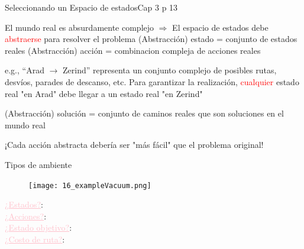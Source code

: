 \documentclass{beamer}
\theoremstyle{definition}
\theoremstyle{theorem}
\theoremstyle{remark}
\begin{document}
\begin{frame}{Seleccionando un Espacio de estados}{Cap 3 p 13}
        
    El mundo real es absurdamente complejo \newline
    \hspace*{1em} $\Rightarrow$ El espacio de estados debe \textcolor{red}{abstraerse} para resolver el problema \newline
    (Abstracción) estado = conjunto de estados reales\newline
    (Abstracción) acción = combinacion compleja de acciones reales\newline
       
    \hspace*{1em} e.g., “Arad $\rightarrow$ Zerind” representa un conjunto complejo de posibles rutas, desvíos, parades de descanso, etc. \newline
    Para garantizar la realización, \textcolor{red}{cualquier} estado real "en Arad" debe llegar a un estado real "en Zerind"\newline
        
    (Abstracción) solución = \newline
    \hspace*{1em} conjunto de caminos reales que son soluciones en el mundo real
        
    ¡Cada acción abstracta debería ser "más fácil" que el problema original!    
        
\end{frame}


\begin{frame}{Tipos de ambiente}
    \begin{figure}\texttt{[image: 16\_exampleVacuum.png]}\end{figure}
    \small{
        \textcolor{Pink}{\underline{¿Estados?}}:\\
        \textcolor{Pink}{\underline{¿Acciones?}}:\\
        \textcolor{Pink}{\underline{¿Estado objetivo?}}:\\
        \textcolor{Pink}{\underline{¿Costo de ruta?}}: 
    }
    \break\break\break\break\break
\end{frame}

\end{document}
